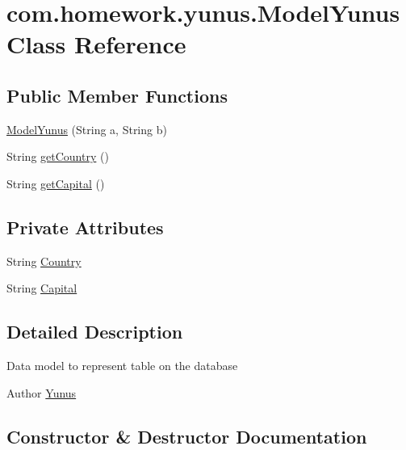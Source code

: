 \hypertarget{classcom_1_1homework_1_1yunus_1_1_model_yunus}{}\section{com.\+homework.\+yunus.\+Model\+Yunus Class Reference}
\label{classcom_1_1homework_1_1yunus_1_1_model_yunus}
\subsection*{Public Member Functions}
\begin{DoxyCompactItemize}
\item 
\hyperlink{classcom_1_1homework_1_1yunus_1_1_model_yunus_a8892831477618db232c3e7e3dfbb83fc}{Model\+Yunus} (String a, String b)
\item 
String \hyperlink{classcom_1_1homework_1_1yunus_1_1_model_yunus_a249312988eb75b2506a26b76435cd3e9}{get\+Country} ()
\item 
String \hyperlink{classcom_1_1homework_1_1yunus_1_1_model_yunus_afdae42e7bc6c2426643bf4a43a3ddc43}{get\+Capital} ()
\end{DoxyCompactItemize}
\subsection*{Private Attributes}
\begin{DoxyCompactItemize}
\item 
String \hyperlink{classcom_1_1homework_1_1yunus_1_1_model_yunus_a8ce3fed48e238b186be6f221e1c330a0}{Country}
\item 
String \hyperlink{classcom_1_1homework_1_1yunus_1_1_model_yunus_a018b7c53abd3d00a1cf6115add99a4c1}{Capital}
\end{DoxyCompactItemize}


\subsection{Detailed Description}
Data model to represent table on the database \begin{DoxyAuthor}{Author}
\hyperlink{classcom_1_1homework_1_1yunus_1_1_yunus}{Yunus} 
\end{DoxyAuthor}


\subsection{Constructor \& Destructor Documentation}
